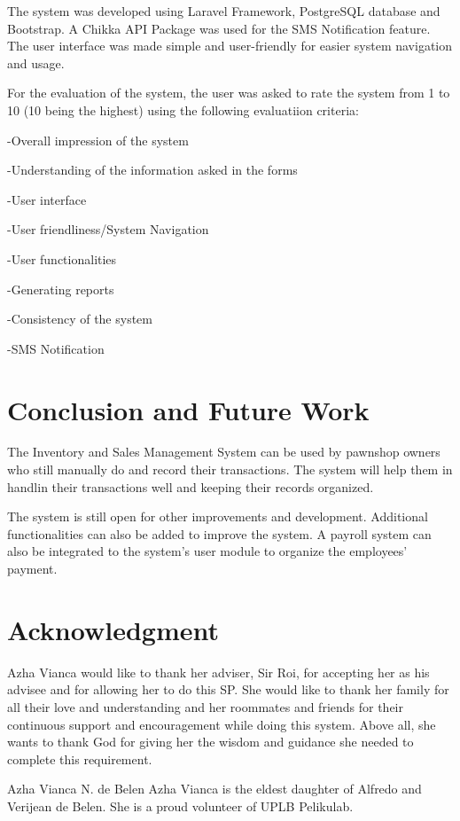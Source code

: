 \documentclass[journal]{./IEEE/IEEEtran}
\begin{document}
The system was developed using Laravel Framework, PostgreSQL database and Bootstrap. A Chikka API Package was used for the SMS Notification feature. The user interface was made simple and user-friendly for easier system navigation and usage.

For the evaluation of the system, the user was asked to rate the system from 1 to 10 (10 being the highest) using the following evaluatiion criteria:

-Overall impression of the system

-Understanding of the information asked in the forms

-User interface

-User friendliness/System Navigation

-User functionalities

-Generating reports

-Consistency of the system

-SMS Notification

\section{Conclusion and Future Work}
The Inventory and Sales Management System can be used by pawnshop owners who still manually do and record their transactions. The system will help them in handlin their transactions well and keeping their records organized. 

The system is still open for other improvements and development. Additional functionalities can also be added to improve the system. A payroll system can also be integrated to the system's user module to organize the employees' payment.

\section*{Acknowledgment}
Azha Vianca would like to thank her adviser, Sir Roi, for accepting her as his advisee and for allowing her to do this SP. She would like to thank her family for all their love and understanding and her roommates  and friends for their continuous support and encouragement while doing this system.  Above all, she wants to thank God for giving her the wisdom and guidance she needed to complete this requirement.





\begin{biography}{Azha Vianca N. de Belen}
Azha Vianca is the eldest daughter of Alfredo and Verijean de Belen. She is a proud volunteer of UPLB Pelikulab.
\end{biography}

 
\end{document}
